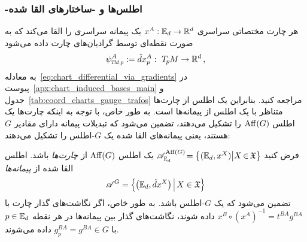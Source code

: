 \subsubsection{\textit{}-اطلس‌ها و \textit{}-ساختارهای القا شده}
هر چارت مختصاتی سراسری $x^A: \mathbb{E}_d \to \mathbb{R}^d$ یک پیمانه سراسری را القا می‌کند که به صورت نقطه‌ای توسط گرادیان‌های چارت داده می‌شود
\begin{align}
	\psiTMp^A := \hat{d}x_p^A :\ \TpM \to \R^d \,,
\end{align}
به معادله~\eqref{eq:chart_differential_via_gradients} در پیوست~\ref{apx:chart_induced_bases_main} و جدول~\ref{tab:coord_charts_gauge_trafos} مراجعه کنید.
بنابراین یک اطلس از چارت‌ها متناظر با یک اطلس از پیمانه‌ها است.
به طور خاص، با توجه به اینکه چارت‌ها یک اطلس $\operatorname{Aff}(G)$ را تشکیل می‌دهند، تضمین می‌شود که تبدیلات پیمانه دارای مقادیر $G$ هستند، یعنی پیمانه‌های القا شده یک $G$-اطلس را تشکیل می‌دهند:
\begin{thm}
	\label{thm:AffG_atlas_induced_G_atlas}
	فرض کنید ${\mathscr{A}^{\operatorname{Aff}(G)}_{\mathbb{E}_d} \!= \big\{ ( \mathbb{E}_d, x^X ) \big| X \mkern-2mu\in\mkern-2mu \mathfrak{X} \big\}}$ یک اطلس $\operatorname{Aff}(G)$ از \emph{چارت‌ها} باشد.
	اطلس القا شده از \emph{پیمانه‌ها}
	\begin{align}
		\mathscr{A}^G = \pig\{ \big(\Euc_d, \hat{d}x^X \big) \,\pig|\, X \in \mathfrak{X} \pig\}
	\end{align}
	تضمین می‌شود که یک $G$-اطلس باشد.
	به طور خاص، اگر نگاشت‌های گذار چارت با ${x^B \circ (x^A)^{-1}} = t^{BA} g^{BA}$ داده شوند، نگاشت‌های گذار بین پیمانه‌ها در هر نقطه $p\in \mathbb{E}_d$ با ${g_p^{BA} = g^{BA} \in G}$ داده می‌شوند.
\end{thm}
